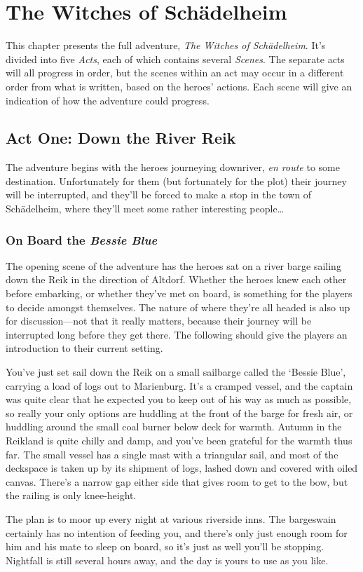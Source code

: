 \chapter{The Witches of Sch{\"a}delheim}\label{ch:adventure}

This chapter presents the full adventure, \textit{The Witches of
Sch{\"a}delheim}. It's divided into five \textit{Acts}, each of which contains
several \textit{Scenes}. The separate acts will all progress in order, but
the scenes within an act may occur in a different order from what is written,
based on the heroes' actions. Each scene will give an indication of how the
adventure could progress.


\section{Act One: Down the River Reik}\label{act1}
The adventure begins with the heroes journeying downriver, \textit{en route} to
some destination. Unfortunately for them (but fortunately for the plot) their
journey will be interrupted, and they'll be forced to make a stop in the town
of Sch{\"a}delheim, where they'll meet some rather interesting people\ldots

\subsection{On Board the \textit{Bessie Blue}}\label{act1scene1}
The opening scene of the adventure has the heroes sat on a river barge sailing
down the Reik in the direction of Altdorf. Whether the heroes knew each other
before embarking, or whether they've met on board, is something for the players
to decide amongst themselves. The nature of where they're all headed is also
up for discussion---not that it really matters, because their journey will be
interrupted long before they get there. The following should give the players an 
introduction to their current setting.

\begin{callout}
You've just set sail down the Reik on a small sailbarge called the `Bessie
Blue', carrying a load of logs out to Marienburg. It's a cramped vessel, and the
captain was quite clear that he expected you to keep out of his way as much as
possible, so really your only options are huddling at the front of the barge
for fresh air, or huddling around the small coal burner below deck for warmth.
Autumn in the Reikland is quite chilly and damp, and you've been grateful for
the warmth thus far. The small vessel has a single mast with a triangular sail,
and most of the deckspace is taken up by its shipment of logs, lashed down and
covered with oiled canvas. There's a narrow gap either side that gives room to
get to the bow, but the railing is only knee-height.

The plan is to moor up every night at various riverside inns. The bargeswain
certainly has no intention of feeding you, and there's only just enough room for
him and his mate to sleep on board, so it's just as well you'll be stopping.
Nightfall is still several hours away, and the day is yours to use as you like.
\end{callout}

